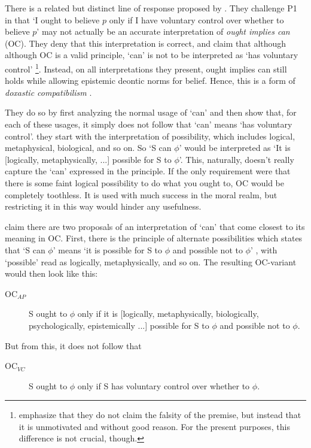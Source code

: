 \documentclass[12pt,numbers=noenddot]{scrartcl}
\begin{document}
There is a related but distinct line of response proposed by \textcite{Chuard2009-CHUENW}. They challenge P1 in that ‘I ought to believe $p$ only if I have voluntary control over whether to believe $p$’ may not actually be an accurate interpretation of \emph{ought implies can} (OC). They deny that this interpretation is correct, and claim that although although OC is a valid principle, ‘can’ is not to be interpreted as ‘has voluntary control’
\footnote{\textcite[601]{Chuard2009-CHUENW} emphasize that they do not claim the falsity of the premise, but instead that it is unmotivated and without good reason. For the present purposes, this difference is not crucial, though.}.
Instead, on all interpretations they present, ought implies can still holds while allowing epistemic deontic norms for belief. Hence, this is a form of \emph{doxastic compatibilism} \autocite[682]{Peels2014-PEEADC}.

They do so by first analyzing the normal usage of ‘can’ and then show that, for each of these usages, it simply does not follow that ‘can’ means ‘has voluntary control’. they start with the interpretation of possibility, which includes logical, metaphysical, biological, and so on. So ‘S can $\phi$’ would be interpreted as ‘It is [logically, metaphysically, ...] possible for S to $\phi$’. This, naturally, doesn't really capture the ‘can’ expressed in the principle. If the only requirement were that there is some faint logical possibility to do what you ought to, OC would be completely toothless. It is used with much success in the moral realm, but restricting it in this way would hinder any usefulness.

 \textcite[616]{Chuard2009-CHUENW} claim there are two proposals of an interpretation of ‘can’ that come closest to its meaning in OC. First, there is the principle of alternate possibilities which states that ‘S can $\phi$’ means ‘it is possible for S to $\phi$ and possible not to $\phi$’ \autocite[615]{Chuard2009-CHUENW}, with ‘possible’ read as logically, metaphysically, and so on. The resulting OC-variant would then look like this:

 \begin{description}
    \item[OC$_{AP}$] S ought to $\phi$ only if it is [logically, metaphysically, biologically, psychologically, epistemically ...] possible for S to $\phi$ and possible not to $\phi$.
 \end{description}

But from this, it does not follow that
\begin{description}
    \item[OC$_{VC}$] S ought to $\phi$ only if S has voluntary control over whether to $\phi$.
 \end{description}
\end{document}
